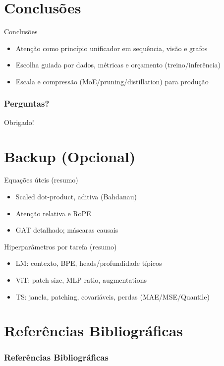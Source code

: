 \documentclass{beamer}
\begin{document}
\section{Conclusões}
\begin{frame}{Conclusões}
	\begin{itemize}[<+->]
		\item Atenção como princípio unificador em sequência, visão e grafos
		\item Escolha guiada por dados, métricas e orçamento (treino/inferência)
		\item Escala e compressão (MoE/pruning/distillation) para produção
	\end{itemize}
\end{frame}

\backmatter
\begin{frame}
	\frametitle{Perguntas?}
	\centering
	Obrigado!
\end{frame}

\section{Backup (Opcional)}
\begin{frame}{Equações úteis (resumo)}
	\small
	\begin{itemize}
		\item Scaled dot-product, aditiva (Bahdanau)
		\item Atenção relativa e RoPE
		\item GAT detalhado; máscaras causais
	\end{itemize}
\end{frame}

\begin{frame}{Hiperparâmetros por tarefa (resumo)}
	\small
	\begin{itemize}
		\item LM: contexto, BPE, heads/profundidade típicos
		\item ViT: patch size, MLP ratio, augmentations
		\item TS: janela, patching, covariáveis, perdas (MAE/MSE/Quantile)
	\end{itemize}
\end{frame}

\section{Referências Bibliográficas}
\begin{frame}[allowframebreaks]
	\frametitle{Referências Bibliográficas}
	
	
\end{frame}
\end{document}

